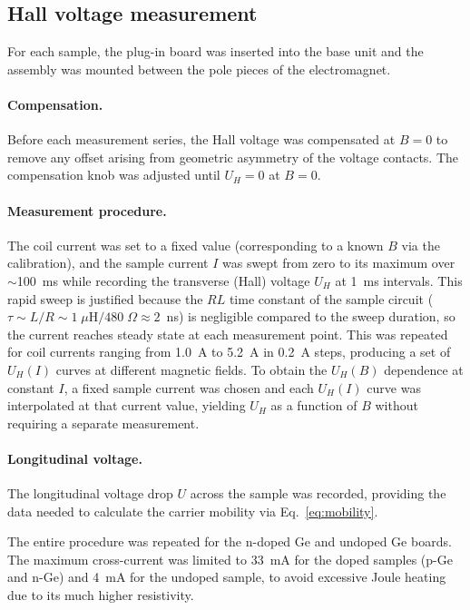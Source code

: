 \documentclass[%
 reprint,
 amsmath,amssymb,
 aps,
]{revtex4-2}
\begin{document}
\subsection{Hall voltage measurement}

For each sample, the plug-in board was inserted into the base unit and the assembly was mounted between the pole pieces of the electromagnet.


\paragraph{Compensation.}
Before each measurement series, the Hall voltage was compensated at $B = 0$ to remove any offset arising from geometric asymmetry of the voltage contacts. The compensation knob was adjusted until $U_H = 0$ at $B=0$.


\paragraph{Measurement procedure.}
The coil current was set to a fixed value (corresponding to a known $B$ via the calibration), and the sample current $I$ was swept from zero to its maximum over $\sim$100~ms while recording the transverse (Hall) voltage $U_H$ at 1~ms intervals. This rapid sweep is justified because the $RL$ time constant of the sample circuit ($\tau \sim L/R \sim 1\;\mu\mathrm{H} / 480\;\Omega \approx 2$~ns) is negligible compared to the sweep duration, so the current reaches steady state at each measurement point. This was repeated for coil currents ranging from 1.0~A to 5.2~A in 0.2~A steps, producing a set of $U_H(I)$ curves at different magnetic fields. To obtain the $U_H(B)$ dependence at constant $I$, a fixed sample current was chosen and each $U_H(I)$ curve was interpolated at that current value, yielding $U_H$ as a function of $B$ without requiring a separate measurement.


\paragraph{Longitudinal voltage.}
The longitudinal voltage drop $U$ across the sample was recorded, providing the data needed to calculate the carrier mobility via Eq.~\eqref{eq:mobility}.

The entire procedure was repeated for the n-doped Ge and undoped Ge boards. The maximum cross-current was limited to 33~mA for the doped samples (p-Ge and n-Ge) and 4~mA for the undoped sample, to avoid excessive Joule heating due to its much higher resistivity.
\end{document}
